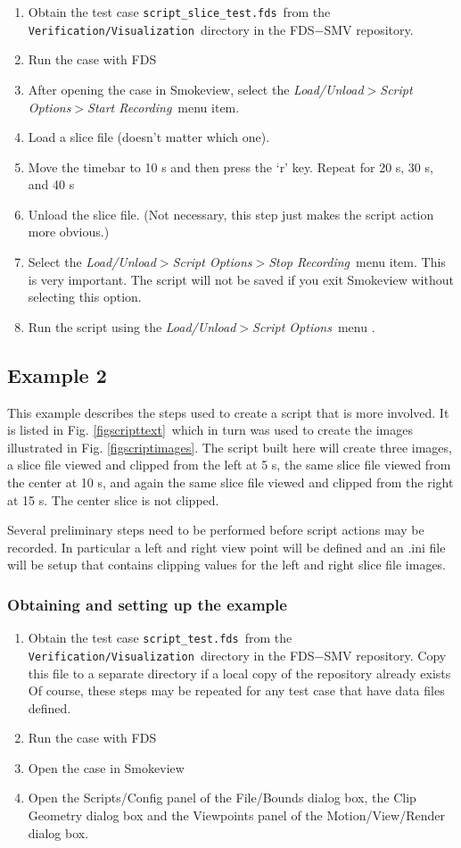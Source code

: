 \documentclass[11pt,twoside]{book}
\begin{document}
\begin{enumerate}
\item Obtain the test case {\tt script\_slice\_test.fds}\ from the
    {\tt Verification/Visualization}\ directory in
the FDS$-$SMV repository.
\item Run the case with FDS
\item After opening the case in Smokeview,
select the {\em Load/Unload$>$Script Options$>$Start Recording}\ menu item.
\item Load a slice file (doesn't matter which one).
\item Move the timebar to 10 s and
then press the `r' key.  Repeat for 20 s, 30 s, and 40 s
\item Unload the slice file. (Not necessary, this step
just makes the script action more obvious.)
\item Select the {\em Load/Unload$>$Script Options$>$Stop Recording}\
menu item.  This is very important.  The script will not be saved
if you exit Smokeview without selecting this option.
\item Run the script using the
  {\em Load/Unload$>$Script Options}\ menu .
\end{enumerate}

\subsection{Example 2}
This example describes the steps used to create a script that is more involved.
It is listed
in Fig. \ref{figscripttext}\ which in turn was used to
create the images
illustrated in Fig. \ref{figscriptimages}.  The script built here
will create three images,
a slice file viewed and clipped from the left at 5 s,
the same slice file viewed from the center at 10 s,
and again the same slice file viewed and clipped from the right at 15 s.
The center slice is not clipped.

Several preliminary steps need to be performed before script actions may be recorded.
In particular a left and right view point will be defined and
an .ini file will be setup that contains clipping values for the
left and right slice file images.

\subsubsection{Obtaining and setting up the example}

\begin{enumerate}
\item Obtain the test case {\tt script\_test.fds}\ from the
    {\tt Verification/Visualization}\ directory in
the FDS$-$SMV repository.  Copy this file to a separate directory
 if a local copy of the repository already exists
 Of course, these steps may be repeated
 for any test case that have data files defined.
\item Run the case with FDS \item Open the case in Smokeview \item
Open the Scripts/Config panel of the File/Bounds dialog
box, the Clip Geometry dialog box and the Viewpoints panel
of the Motion/View/Render dialog box.
\end{enumerate}
\end{document}

